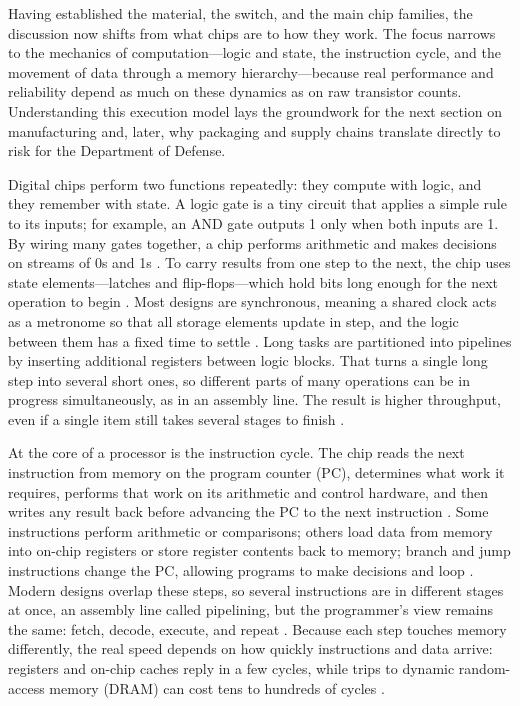 Having established the material, the switch, and the main chip families, the discussion now shifts from what chips are to how they work. The focus narrows to the mechanics of computation---logic and state, the instruction cycle, and the movement of data through a memory hierarchy---because real performance and reliability depend as much on these dynamics as on raw transistor counts. Understanding this execution model lays the groundwork for the next section on manufacturing and, later, why packaging and supply chains translate directly to risk for the Department of Defense.

Digital chips perform two functions repeatedly: they compute with logic, and they remember with state. A logic gate is a tiny circuit that applies a simple rule to its inputs; for example, an AND gate outputs 1 only when both inputs are 1. By wiring many gates together, a chip performs arithmetic and makes decisions on streams of 0s and 1s \parencite{rabaey_digital_2003,harris_digital_2022}. To carry results from one step to the next, the chip uses state elements---latches and flip-flops---which hold bits long enough for the next operation to begin \parencite{rabaey_digital_2003,harris_digital_2022}. Most designs are synchronous, meaning a shared clock acts as a metronome so that all storage elements update in step, and the logic between them has a fixed time to settle \parencite{weste_cmos_2011}. Long tasks are partitioned into pipelines by inserting additional registers between logic blocks. That turns a single long step into several short ones, so different parts of many operations can be in progress simultaneously, as in an assembly line. The result is higher throughput, even if a single item still takes several stages to finish \parencite{patterson_computer_2018}.

At the core of a processor is the instruction cycle. The chip reads the next instruction from memory on the program counter (PC), determines what work it requires, performs that work on its arithmetic and control hardware, and then writes any result back before advancing the PC to the next instruction \parencite{harris_digital_2022}. Some instructions perform arithmetic or comparisons; others load data from memory into on-chip registers or store register contents back to memory; branch and jump instructions change the PC, allowing programs to make decisions and loop \parencite{patterson_computer_2018}. Modern designs overlap these steps, so several instructions are in different stages at once, an assembly line called pipelining, but the programmer's view remains the same: fetch, decode, execute, and repeat \parencite{hennessy_computer_2012}. Because each step touches memory differently, the real speed depends on how quickly instructions and data arrive: registers and on-chip caches reply in a few cycles, while trips to dynamic random-access memory (DRAM) can cost tens to hundreds of cycles \parencite{jacob_memory_2008}.

